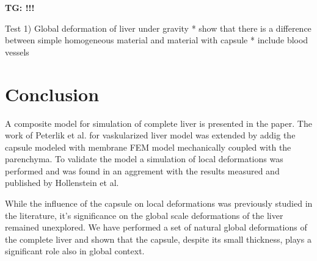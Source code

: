 \documentclass{llncs}
\newcommand{\TG}[1]{{\color{blue}\textbf{TG: #1}}}
\begin{document}
\TG{!!!}

Test 1) Global deformation of liver under gravity
  * show that there is a difference between simple homogeneous material
    and material with capsule
  * include blood vessels


\section{Conclusion} %

A composite model for simulation of complete liver is presented in the
paper. The work of Peterlik et al. for vaskularized liver model was
extended by addig the capsule modeled with membrane FEM model mechanically
coupled with the parenchyma. To validate the model a simulation of local
deformations was performed and was found in an aggrement with the results
measured and published by Hollenstein et al.

While the influence of the capsule on local deformations was previously
studied in the literature, it's significance on the global scale
deformations of the liver remained unexplored. We have performed a set of
natural global deformations of the complete liver and shown that the
capsule, despite its small thickness, plays a significant role also in
global context.


%
%



\end{document}
